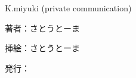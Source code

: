 \documentclass[a4paper,11pt]{jsbook}
\begin{document}
\begin{thebibliography}{2}

K.miyuki (private communication)
\end{thebibliography}

\thispagestyle{empty}
\begin{flushright}
\begin{minipage}{0.5\hsize}
\begin{description}
  \item{著者：}さとうとーま
  \item{挿絵：}さとうとーま
  \item{発行：}\date{\today}
\end{description}
\end{minipage}
\end{flushright}
\end{document}
